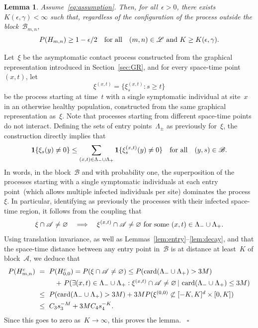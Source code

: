 \documentclass[letterpaper,11pt,twoside,keywordsasfootnote,addressatend,noinfoline]{article}
\newtheorem{lemma}[theorem]{Lemma}
\newenvironment{proof}{\noindent{\bf Proof.}}{\hspace*{2mm}~$\square$}
\newcommand{\A}{\mathscr{A}}
\newcommand{\B}{\mathscr{B}}
\newcommand{\Lat}{\mathscr{L}}
\newcommand{\ind}{\mathbf{1}}
\newcommand{\ep}{\epsilon}
\newcommand{\n}{\hspace*{-5pt}}
\DeclareMathOperator{\card}{card}
\begin{document}
\begin{lemma}
\label{lem:H}
 Assume~\eqref{eq:assumption}.
 Then, for all~$\ep > 0$, there exists~$K (\ep, \gamma) < \infty$ such that, regardless of the configuration of the process outside the block~$\B_{m, n}$,
 $$ P (H_{m, n}) \geq 1 - \ep / 2 \quad \hbox{for all} \quad (m, n) \in \Lat \ \hbox{and} \ K \geq K (\ep, \gamma). $$
\end{lemma}
\begin{proof}
 Let~$\xi$ be the asymptomatic contact process constructed from the graphical representation introduced in Section~\ref{sec:GR}, and for every space-time point~$(x, t)$, let
 $$ \xi^{(x, t)} = \{\xi_s^{(x, t)} : s \geq t \} $$
 be the process starting at time~$t$ with a single symptomatic individual at site~$x$ in an otherwise healthy population, constructed from the same graphical representation as~$\xi$.
 Note that processes starting from different space-time points do not interact.
 Defining the sets of entry points~$\Lambda_{\pm}$ as previously for~$\xi$, the construction directly implies that
 $$ \ind \{\xi_s (y) \neq 0 \} \leq \sum_{(x, t) \in \Lambda_- \cup \Lambda_+} \ind \{\xi_s^{(x, t)} (y) \neq 0 \} \quad \hbox{for all} \quad (y, s) \in \B. $$
 In words, in the block~$\B$ and with probability one, the superposition of the processes starting with a single symptomatic individuals at each entry point~(which allows multiple infected individuals per site) dominates the process~$\xi$.
 In particular, identifying as previously the processes with their infected space-time region, it follows from the coupling that
 $$ \xi \cap \A \neq \varnothing \quad \Longrightarrow \quad \xi^{(x, t)} \cap \A \neq \varnothing \ \hbox{for some} \ (x, t) \in \Lambda_- \cup \Lambda_+. $$
 Using translation invariance, as well as Lemmas~\ref{lem:entry}--\ref{lem:decay}, and that the space-time distance between any entry point in~$\B$ is at distance at least~$K$ of block~$\A$, we deduce that
 $$ \begin{array}{rcl}
      P (H_{m, n}^c) & \n = \n &
      P (H_{0, 0}^c) = P (\xi \cap \A \neq \varnothing) \leq P (\card (\Lambda_- \cup \Lambda_+) > 3M) \vspace*{4pt} \\ && \hspace*{10pt} + \
      P (\exists (x, t) \in \Lambda_- \cup \Lambda_+ : \xi^{(x, t)} \cap \A \neq \varnothing \,| \,\card (\Lambda_- \cup \Lambda_+) \leq 3M) \vspace*{4pt} \\ & \n \leq \n &
      P (\card (\Lambda_- \cup \Lambda_+) > 3M) + 3M P (\xi^{(0, 0)} \not \subset [-K, K]^d \times [0, K]) \vspace*{4pt} \\ & \n \leq \n &
      C_3 s_3^{-M} + 3M C_4 s_4^{-K}. \end{array} $$
 Since this goes to zero as~$K \to \infty$, this proves the lemma.
\end{proof} \vspace*{8pt} \\
\end{document}
